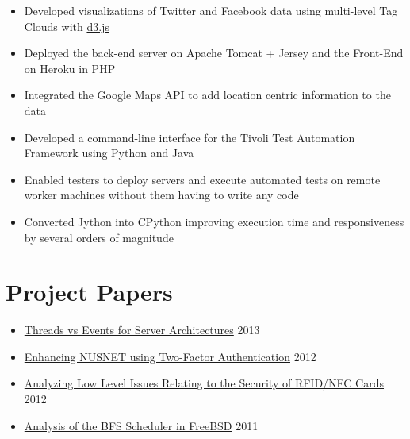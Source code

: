 \documentclass[11pt,a4paper]{moderncv}
\begin{document}
{\begin{itemize}
        \item Developed visualizations of Twitter and Facebook data using multi-level Tag Clouds with \href{http://d3js.org/}{d3.js}
        \item Deployed the back-end server on Apache Tomcat + Jersey and the Front-End on Heroku in PHP
        \item Integrated the Google Maps API to add location centric information to the data
 \end{itemize}}

{\begin{itemize}
        \item Developed a command-line interface for the Tivoli Test Automation Framework using Python and Java
        \item Enabled testers to deploy servers and execute automated tests on remote worker machines without them having to write any code
        \item Converted Jython into CPython improving execution time and responsiveness by several orders of magnitude
 \end{itemize}}
\section{Project Papers}
\begin{itemize}
\item \href{https://github.com/vellvisher/papers_reports/raw/master/Threads_vs_Events_Server_Architectures.pdf}{Threads vs Events for Server Architectures} \hfill 2013
\item \href{https://github.com/vellvisher/papers_reports/raw/master/NUS_2FA_GA.pdf}{Enhancing NUSNET using Two-Factor Authentication} \hfill 2012
\item \href{https://github.com/vellvisher/papers_reports/raw/master/RFID_NFC.pdf}{Analyzing Low Level Issues Relating to the Security of RFID/NFC Cards} \hfill 2012
\item \href{https://github.com/vellvisher/papers_reports/raw/master/BFS_FreeBSD.pdf}{Analysis of the BFS Scheduler in FreeBSD} \hfill 2011
\end{itemize}
\pagebreak
\end{document}
